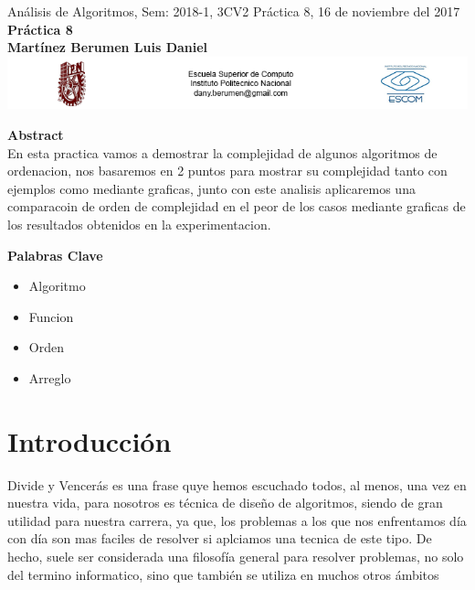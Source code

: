 \documentclass[spanish]{article}
\begin{document}
	\setmarginsrb{30mm}{30mm}{30mm}{30mm}{0pt}{0mm}{0pt}{0mm}
	
	\begin{center}
	{ Análisis de Algoritmos, Sem: 2018-1, 3CV2 Práctica 8, 16 de noviembre del 2017 }\\
{ {\bf Práctica 8}} \\
{ {\bf Martínez Berumen Luis Daniel}} \\
\includegraphics[width=1\textwidth, right]{./imagenes/logos.png}
	\end{center}

	
	\bigskip
	
	\bigskip
	
	\bigskip
	
	{\LARGE {\bf Abstract}}\\
	
	En esta practica vamos a demostrar la complejidad de algunos algoritmos de ordenacion, nos basaremos en 2 puntos para mostrar su complejidad tanto con ejemplos como mediante graficas, junto con este analisis aplicaremos una comparacoin de orden de complejidad en el peor de los casos mediante graficas de los resultados obtenidos en la experimentacion.

	\bigskip


	{\Large {\bf Palabras Clave}}\\
	\begin{itemize}
		\item Algoritmo
		\item Funcion
		\item Orden
		\item Arreglo
	\end{itemize}
	
	\section{Introducci\'on}
	Divide y Vencerás es una frase quye hemos escuchado todos, al menos, una vez en nuestra vida, para nosotros 
	es técnica de diseño de algoritmos, siendo de gran utilidad para nuestra carrera, ya que, 
	los problemas a los que nos enfrentamos día con día son mas faciles de resolver si aplciamos una tecnica de este tipo.
	De hecho, suele ser considerada una filosofía general para resolver problemas, no solo del termino informatico, sino que también           se utiliza en muchos otros ámbitos
\end{document}
